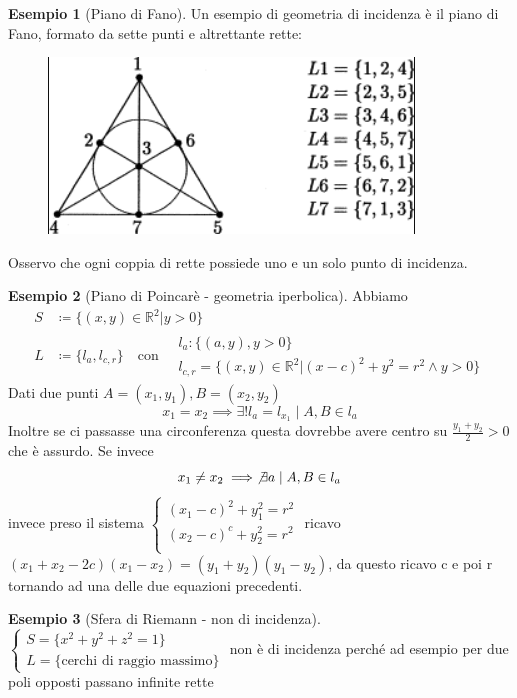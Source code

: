 \documentclass[a4paper,10pt]{article}
\theoremstyle{definition}
\newcommand{\re}{\mathbb{R}} %
\theoremstyle{indentdefinition}
\theoremstyle{indentpostulate}
\theoremstyle{indenttheorem}
\theoremstyle{myremark}
\newtheorem{example*}{Esempio}
\theoremstyle{indentgeneral}
\begin{document}
\begin{example*}[Piano di Fano]
    Un esempio di geometria di incidenza è il piano di Fano, formato da sette punti e altrettante rette:

\begin{figure}[H]
    \centering
    \includegraphics[scale=0.7]{Fano5.png}
\end{figure}

Osservo che ogni coppia di rette possiede uno e un solo punto di incidenza.
\end{example*}

\begin{example*}[Piano di Poincarè - geometria iperbolica] Abbiamo
\begin{align*}
    S&\coloneqq \{ (x,y) \in \re^2|y>0 \} \\
    L&\coloneqq \{ l_a, l_{c,r} \} \quad \text{con} \quad 
    \begin{array}{l}
        l_a:\{ (a,y), y>0 \}   \\
           l_{c,r}=\{ (x,y) \in \re^2| (x-c)^2+y^2=r^2 \land y>0 \}
    \end{array}
\end{align*}
    Dati due punti $A=(x_1,y_1),B=(x_2,y_2)$ $$x_1=x_2 \implies \exists ! l_a=l_{x_1}\mid A,B \in l_a$$ Inoltre se ci passasse una circonferenza questa dovrebbe avere centro su $ \frac{y_1+y_2}{2}>0$ che è assurdo. Se invece $$x_1 \neq x_2 \implies\not \exists a\mid A,B \in l_a$$ invece preso il sistema
$\begin{cases}
(x_1-c)^2+y_1^2=r^2 \\
(x_2-c)^c+y_2^2=r^2 \\
\end{cases}$
ricavo $(x_1+x_2-2c)(x_1-x_2)=(y_1+y_2)(y_1-y_2)$, da questo ricavo c e poi r tornando ad una delle due equazioni precedenti.
\end{example*}

\begin{example*}[Sfera di Riemann - non di incidenza]
    $\begin{cases}
        S=\{x^2+y^2+z^2=1\}\\
        L=\{\text{cerchi di raggio massimo}\}
    \end{cases}$ non è di incidenza perché ad esempio per due poli opposti passano infinite rette
\end{example*}
\end{document}
